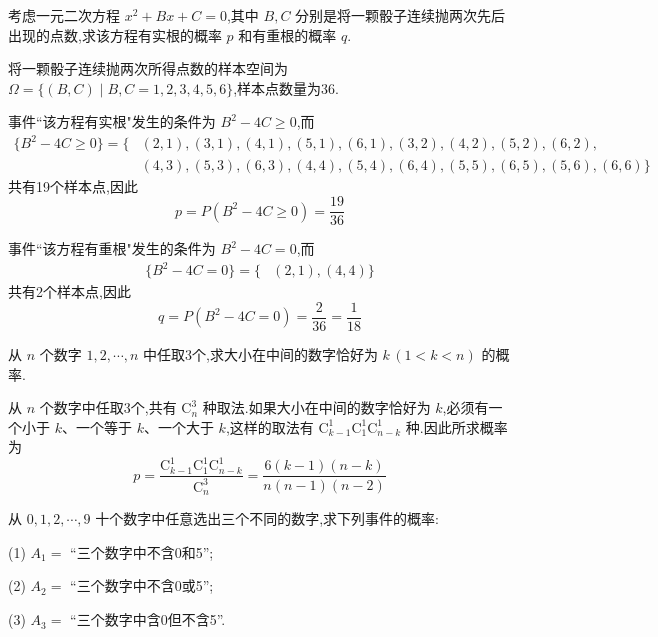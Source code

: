 \question 考虑一元二次方程 $x^2 + Bx + C = 0$,其中 $B,C$ 分别是将一颗骰子连续抛两次先后出现的点数,求该方程有实根的概率 $p$ 和有重根的概率 $q$.

\begin{solution}
    将一颗骰子连续抛两次所得点数的样本空间为 $\varOmega = \{ (B,C) \mid B,C=1,2,3,4,5,6 \}$,样本点数量为36.
    
    事件``该方程有实根"发生的条件为 $B^2 - 4C \geqslant 0$,而
    $$
    \begin{aligned}
        \{ B^2 - 4C \geqslant 0 \} = \{ & (2,1), (3,1), (4,1), (5,1), (6,1), (3,2), (4,2), (5,2), (6,2), \\
        & (4,3), (5,3), (6,3), (4,4), (5,4), (6,4), (5,5), (6,5), (5,6), (6,6) \}
    \end{aligned}
    $$
    共有19个样本点,因此
    $$
    p = P(B^2 - 4C \geqslant 0) = \dfrac{19}{36}
    $$

    事件``该方程有重根"发生的条件为 $B^2 - 4C = 0$,而
    $$
    \begin{aligned}
        \{ B^2 - 4C = 0 \} = \{ & (2,1), (4,4) \}
    \end{aligned}
    $$
    共有2个样本点,因此
    $$
    q = P(B^2 - 4C = 0) = \dfrac{2}{36} = \dfrac{1}{18}
    $$
\end{solution}

\question 从 $n$ 个数字 $1,2,\cdots,n$ 中任取3个,求大小在中间的数字恰好为 $k \, (1 < k < n)$ 的概率.

\begin{solution}
    从 $n$ 个数字中任取3个,共有 $\mathrm{C}_{n}^3$ 种取法.如果大小在中间的数字恰好为 $k$,必须有一个小于 $k$、一个等于 $k$、一个大于 $k$,这样的取法有 $\mathrm{C}_{k-1}^1 \mathrm{C}_1^1 \mathrm{C}_{n-k}^1$ 种.因此所求概率为
    $$
    p = \dfrac{\mathrm{C}_{k-1}^1 \mathrm{C}_1^1 \mathrm{C}_{n-k}^1}{\mathrm{C}_{n}^3} = \dfrac{6(k-1)(n-k)}{n(n-1)(n-2)}
    $$
\end{solution}

\question 从 $0, 1, 2, \cdots, 9$ 十个数字中任意选出三个不同的数字,求下列事件的概率:

(1) $A_1=$ ``三个数字中不含0和5'';

(2) $A_2=$ ``三个数字中不含0或5'';

(3) $A_3=$ ``三个数字中含0但不含5''.

